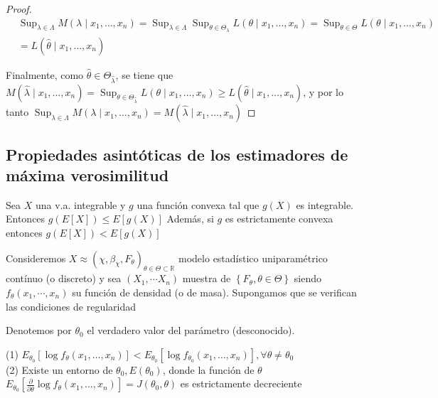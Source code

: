 \begin{proof}
  $$
    \begin{aligned}
       & \operatorname{Sup}_{\lambda \in \Lambda} M\left(\lambda \mid x_{1}, \ldots, x_{n}\right)=\operatorname{Sup}_{\lambda \in \Lambda} \operatorname{Sup}_{\theta \in \Theta_{\lambda}} L\left(\theta \mid x_{1}, \ldots, x_{n}\right)=\operatorname{Sup}_{\theta \in \Theta} L\left(\theta \mid x_{1}, \ldots, x_{n}\right) \\
       & =L\left(\hat{\theta} \mid x_{1}, \ldots, x_{n}\right)
    \end{aligned}
  $$

  Finalmente, como $\hat{\theta} \in \Theta_{\hat{\lambda}}$, se tiene que\\
  $M\left(\hat{\lambda} \mid x_{1}, \ldots,
    x_{n}\right)=\operatorname{Sup}_{\theta \in \Theta_{\hat{\lambda}}}
    L\left(\theta \mid x_{1}, \ldots, x_{n}\right) \geq L\left(\hat{\theta} \mid
    x_{1}, \ldots, x_{n}\right)$, y por lo\\ tanto $\operatorname{Sup}_{\lambda \in
      \Lambda} M\left(\lambda \mid x_{1}, \ldots, x_{n}\right)=M\left(\hat{\lambda}
    \mid x_{1}, \ldots, x_{n}\right)$

\end{proof}

\subsection{Propiedades asintóticas de los estimadores de máxima verosimilitud}

\begin{proposición} 
Sea $X$ una v.a. integrable y $g$ una función convexa tal que $g(X)$ es integrable. Entonces $g(E[X]) \leq E[g(X)]$ Además, si $g$ es estrictamente convexa entonces $g(E[X])<E[g(X)]$
\end{proposición}

Consideremos $X \approx\left(\chi, \beta_{\chi}, F_{\theta}\right)_{\theta \in
  \Theta \subset \mathbb{R}}$ modelo estadístico uniparamétrico contínuo (o
discreto) y sea $\left(X_{1}, \cdots X_{n}\right)$ muestra de
$\left\{F_{\theta}, \theta \in \Theta\right\}$ siendo $f_{\theta}\left(x_{1},
  \cdots, x_{n}\right)$ su función de densidad (o de masa). Supongamos que se
verifican las condiciones de regularidad

Denotemos por $\theta_{0}$ el verdadero valor del parámetro (desconocido).

\begin{lema}
  (1) $E_{\theta_{0}}\left[\log f_{\theta}\left(x_{1}, \ldots, x_{n}\right)\right]<E_{\theta_{0}}\left[\log f_{\theta_{0}}\left(x_{1}, \ldots, x_{n}\right)\right], \forall \theta \neq \theta_{0}$\\
  (2) Existe un entorno de $\theta_{0}, E\left(\theta_{0}\right)$, donde la función de $\theta$ $E_{\theta_{0}}\left[\frac{\partial}{\partial \theta} \log f_{\theta}\left(x_{1}, \ldots, x_{n}\right)\right]=J\left(\theta_{0}, \theta\right)$ es estrictamente decreciente
\end{lema}


